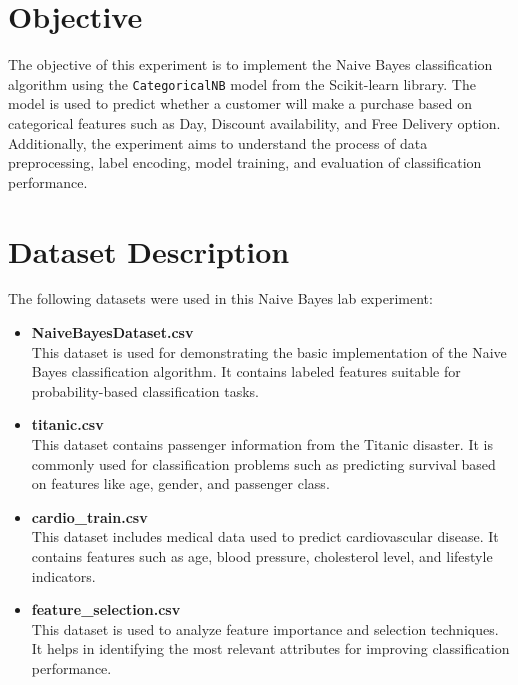 \documentclass[11pt]{article}
\begin{document}
    
\tableofcontents
\thispagestyle{empty}
\clearpage
{}
    
    
\section{Objective}
The objective of this experiment is to implement the Naive Bayes classification algorithm using the \texttt{CategoricalNB} model from the Scikit-learn library. The model is used to predict whether a customer will make a purchase based on categorical features such as Day, Discount availability, and Free Delivery option. Additionally, the experiment aims to understand the process of data preprocessing, label encoding, model training, and evaluation of classification performance.

\section{Dataset Description}

The following datasets were used in this Naive Bayes lab experiment:

\begin{itemize}
    \item \textbf{NaiveBayesDataset.csv} \\
    This dataset is used for demonstrating the basic implementation of the Naive Bayes classification algorithm. It contains labeled features suitable for probability-based classification tasks.

    \item \textbf{titanic.csv} \\
    This dataset contains passenger information from the Titanic disaster. It is commonly used for classification problems such as predicting survival based on features like age, gender, and passenger class.

    \item \textbf{cardio\_train.csv} \\
    This dataset includes medical data used to predict cardiovascular disease. It contains features such as age, blood pressure, cholesterol level, and lifestyle indicators.

    \item \textbf{feature\_selection.csv} \\
    This dataset is used to analyze feature importance and selection techniques. It helps in identifying the most relevant attributes for improving classification performance.
\end{itemize}
\end{document}
